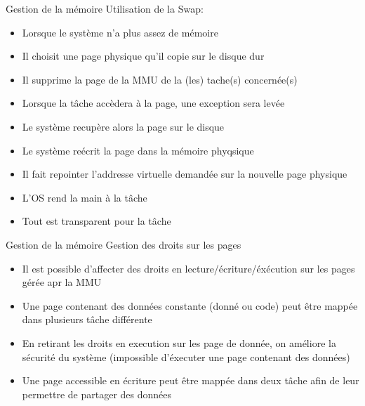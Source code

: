 \begin{frame}{ Gestion de la mémoire}
  Utilisation de la Swap:
  \begin{itemize}
  \item Lorsque le système n'a plus assez de mémoire
  \item Il choisit une page physique qu'il copie sur le disque dur
  \item  Il  supprime  la  page   de  la  MMU  de  la  (les)  tache(s)
    concernée(s)
  \item Lorsque la tâche accèdera à la page, une exception sera levée
  \item Le système recupère alors la page sur le disque
  \item Le système reécrit la page dans la mémoire phyqsique
  \item  Il  fait  repointer  l'addresse  virtuelle  demandée  sur  la
    nouvelle page physique
  \item L'OS rend la main à la tâche
  \item Tout est transparent pour la tâche
  \end{itemize}
\end{frame}

\begin{frame}{ Gestion de la mémoire}
  Gestion des droits sur les pages
  \begin{itemize}
  \item    Il    est     possible    d'affecter    des    droits    en
    lecture/écriture/éxécution sur les pages gérée apr la MMU
  \item Une page contenant des  données constante (donné ou code) peut
    être mappée dans plusieurs tâche différente
  \item En retirant les droits en execution sur les page de donnée, on
    améliore la  sécurité du  système (impossible d'éxecuter  une page
    contenant des données)
  \item Une  page accessible  en écriture peut  être mappée  dans deux
    tâche afin de leur permettre de partager des données
    \end{itemize} 
\end{frame}

